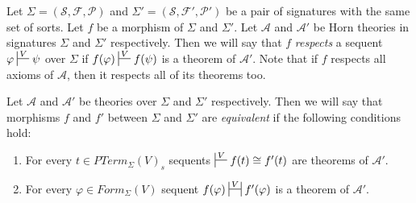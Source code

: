 \documentclass{amsart}
\theoremstyle{definition}
\theoremstyle{remark}
\numberwithin{figure}{section}
\begin{document}
Let $\Sigma = (\mathcal{S}, \mathcal{F}, \mathcal{P})$ and $\Sigma' = (\mathcal{S}, \mathcal{F}', \mathcal{P}')$ be a pair of signatures with the same set of sorts.
Let $f$ be a morphism of $\Sigma$ and $\Sigma'$.
Let $\mathcal{A}$ and $\mathcal{A}'$ be Horn theories in signatures $\Sigma$ and $\Sigma'$ respectively.
Then we will say that $f$ \emph{respects} a sequent $\varphi \sststile{}{V} \psi$ over $\Sigma$ if $f(\varphi) \sststile{}{V} f(\psi)$ is a theorem of $\mathcal{A}'$.
Note that if $f$ respects all axioms of $\mathcal{A}$, then it respects all of its theorems too.

Let $\mathcal{A}$ and $\mathcal{A}'$ be theories over $\Sigma$ and $\Sigma'$ respectively.
Then we will say that morphisms $f$ and $f'$ between $\Sigma$ and $\Sigma'$ are \emph{equivalent} if the following conditions hold:
\begin{enumerate}
\item For every $t \in PTerm_\Sigma(V)_s$ sequents $\sststile{}{V} f(t) \cong f'(t)$ are theorems of $\mathcal{A}'$.
\label{mor-eq-a}
\item For every $\varphi \in Form_\Sigma(V)$ sequent $f(\varphi) \ssststile{}{V} f'(\varphi)$ is a theorem of $\mathcal{A}'$.
\label{mor-eq-b}
\end{enumerate}
\end{document}
